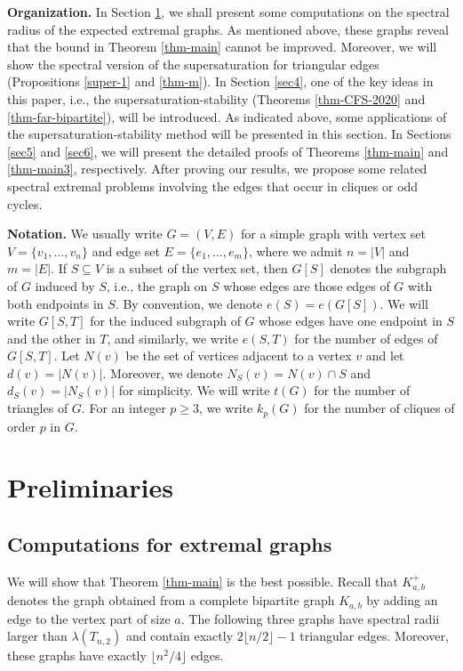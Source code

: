 \documentclass[11pt]{article}
\begin{document}
\medskip 


\noindent 
{\bf Organization.}  
 In Section \ref{sec3}, we shall present 
 some computations on the spectral radius of the expected extremal graphs. As mentioned above, these graphs 
 reveal that the bound in Theorem \ref{thm-main} cannot be improved. 
 Moreover, we will show the spectral version of 
 the supersaturation for triangular edges (Propositions \ref{super-1} and \ref{thm-m}). 
 In Section \ref{sec4}, 
one of the key ideas in this paper, i.e., 
the supersaturation-stability (Theorems \ref{thm-CFS-2020} and \ref{thm-far-bipartite}),
 will be introduced. 
 As indicated above,  some applications 
of the supersaturation-stability method will be presented in this section.  
In Sections \ref{sec5} and \ref{sec6}, 
we will present the detailed proofs of Theorems \ref{thm-main} and 
 \ref{thm-main3}, respectively.  
After proving our results, we propose some related spectral extremal problems  involving 
the edges that occur in cliques or odd cycles. 


\medskip 
\noindent 
{\bf Notation.} 
We usually write $G=(V,E)$ for a simple graph with vertex set 
$V=\{v_1,\ldots ,v_n\}$ and edge set $E=\{e_1,\ldots ,e_m\}$, where we admit $n=|V|$ and $m=|E|$. 
If $S\subseteq V$ is a subset of the vertex set, then 
$G[S]$ denotes the subgraph of $G$ induced by $S$, 
i.e., the graph on $S$ whose edges are those edges of $G$ 
with both endpoints in $S$. By convention, we denote $e(S)=e(G[S])$.  
We will write $G[S,T]$ for the induced 
subgraph of $G$
whose edges have one endpoint in $S$ and the other in $T$,  and similarly, we write $e(S,T)$ for the number of edges 
of $G[S,T]$.  
Let $N(v)$ be the set of vertices adjacent to a vertex $v$ and 
let $d(v)=|N(v)|$. 
Moreover, we denote $N_S(v)= N(v) \cap S$ 
and $d_S(v)=|N_S(v)|$ for simplicity. 
 We will write $t(G)$ for the number of triangles of $G$. 
For an integer $p\ge 3$, we write $k_p(G)$ for the number of cliques of order $p$  in $G$. 



\section{Preliminaries}
\label{sec3}


\subsection{Computations for extremal graphs}


We will show that  Theorem \ref{thm-main} is the best possible. 
Recall that $K_{a,b}^+$ denotes the graph obtained from 
a complete bipartite graph $K_{a,b}$ by adding an edge to 
the vertex part of size $a$. 
The following three graphs have spectral radii larger than 
$\lambda (T_{n,2})$ and contain exactly 
$2 \lfloor n/2 \rfloor -1$ triangular edges. 
Moreover, these graphs have exactly $\lfloor n^2/4\rfloor$ 
edges. 
\end{document}
